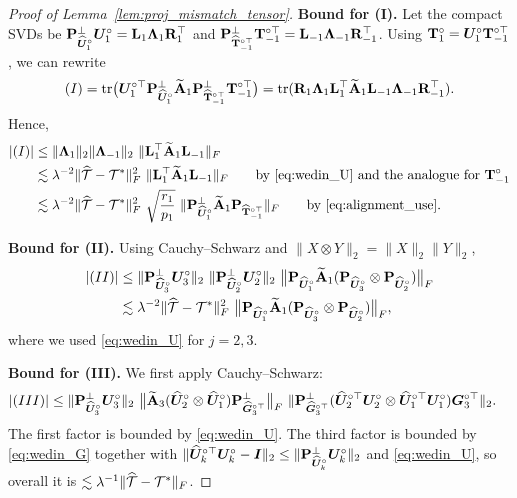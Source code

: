 \documentclass[authoryear,preprint,review,12pt]{elsarticle}
\begin{document}
{\begin{proof}[Proof of Lemma~\ref{lem:proj_mismatch_tensor}]
		\smallskip
		\noindent\textbf{Bound for (I).}
		Let the compact SVDs be
		$\mathbf{P}_{\widehat{\boldsymbol U}_1^\circ}^{\perp}\boldsymbol U_1^\circ=\mathbf{L}_1\boldsymbol \Lambda_1\mathbf{R}_1^\top$ and
		$\mathbf{P}_{\widehat{\mathbf{T}}_{-1}^{\circ\top}}^{\perp}\mathbf{T}_{-1}^{\circ\top}=\mathbf{L}_{-1}\boldsymbol \Lambda_{-1}\mathbf{R}_{-1}^\top$.
		Using $\mathbf{T}_1^\circ=\boldsymbol U_1^\circ\mathbf{T}_{-1}^{\circ\top}$, we can rewrite
		\[
		(I)=\mathrm{tr}\big(\boldsymbol U_1^{\circ\top}\mathbf{P}_{\widehat{\boldsymbol U}_1^\circ}^{\perp}\widetilde{\mathbf{A}}_1\mathbf{P}_{\widehat{\mathbf{T}}_{-1}^{\circ\top}}^{\perp}\mathbf{T}_{-1}^{\circ\top} \big)
		=
		\mathrm{tr}(\mathbf{R}_1\boldsymbol \Lambda_1\mathbf{L}_1^\top\widetilde{\mathbf{A}}_1\mathbf{L}_{-1}\boldsymbol \Lambda_{-1}\mathbf{R}_{-1}^\top).
		\]
		Hence,
		\begin{align}
			|(I)|
			&\le \|\bLambda_1\|_2\|\bLambda_{-1}\|_2\ \|\bL_1^\top\widetilde{\bA}_1\bL_{-1}\|_F
			\notag\\
			&\lesssim \lambda^{-2}\|\widehat{\mT}-\mT^\ast\|_F^2\ \|\bL_1^\top\widetilde{\bA}_1\bL_{-1}\|_F
			\qquad\text{by }\eqref{eq:wedin_U}\text{ and the analogue for }\bT_{-1}^\circ
			\notag\\
			&\lesssim \lambda^{-2}\|\widehat{\mT}-\mT^\ast\|_F^2\ \sqrt{\frac{r_1}{p_1}}\ \|\bP_{\widehat{\bU}_1^\circ}^{\perp}\widetilde{\bA}_1\bP_{\widehat{\bT}_{-1}^{\circ\top}}\|_F
			\qquad\text{by }\eqref{eq:alignment_use}.
			\label{eq:I_bound}
		\end{align}
		
		\smallskip
		\noindent\textbf{Bound for (II).}
		Using Cauchy--Schwarz and $\|X\otimes Y\|_2=\|X\|_2\|Y\|_2$,
		\begin{align}
			|(II)|
			&\le
			\|\bP_{\widehat{\bU}_3^\circ}^{\perp}\bU_3^\circ\|_2\ \|\bP_{\widehat{\bU}_2^\circ}^{\perp}\bU_2^\circ\|_2\
			\big\|\bP_{\widehat{\bU}_1^\circ}\widetilde{\bA}_1(\bP_{\widehat{\bU}_3^\circ}\otimes\bP_{\widehat{\bU}_2^\circ})\big\|_F
			\notag\\
			&\lesssim \lambda^{-2}\|\widehat{\mT}-\mT^\ast\|_F^2\
			\big\|\bP_{\widehat{\bU}_1^\circ}\widetilde{\bA}_1(\bP_{\widehat{\bU}_3^\circ}\otimes\bP_{\widehat{\bU}_2^\circ})\big\|_F,
			\label{eq:II_bound}
		\end{align}
		where we used \eqref{eq:wedin_U} for $j=2,3$.
		
		\smallskip
		\noindent\textbf{Bound for (III).}
		We first apply Cauchy--Schwarz:
		\begin{align}
			|(III)|
			&\le
			\|\mathbf{P}_{\widehat{\boldsymbol U}_3^\circ}^{\perp}\boldsymbol U_3^\circ\|_2\
			\big\|\widetilde{\mathbf{A}}_3(\widehat{\boldsymbol U}_2^\circ\otimes\widehat{\boldsymbol U}_1^\circ)\mathbf{P}_{\widehat{\boldsymbol G}_3^{\circ\top}}^{\perp}\big\|_F\
			\|\mathbf{P}_{\widehat{\boldsymbol G}_3^{\circ\top}}^{\perp}(\widehat{\boldsymbol U}_2^{\circ\top}\boldsymbol U_2^\circ\otimes \widehat{\boldsymbol U}_1^{\circ\top}\boldsymbol U_1^\circ)\boldsymbol G_3^{\circ\top}\|_2.
			\notag
		\end{align}
		The first factor is bounded by \eqref{eq:wedin_U}. The third factor is bounded by \eqref{eq:wedin_G} together with
		$\|\widehat{\boldsymbol U}_k^{\circ\top}\boldsymbol U_k^\circ-\boldsymbol I\|_2\le \|\mathbf{P}_{\widehat{\boldsymbol U}_k^\circ}^{\perp}\boldsymbol U_k^\circ\|_2$ and \eqref{eq:wedin_U},
		so overall it is $\lesssim \lambda^{-1}\|\widehat{\mathcal{T}}-\mathcal{T}^\ast\|_F$.
		

\end{proof}}
\end{document}
